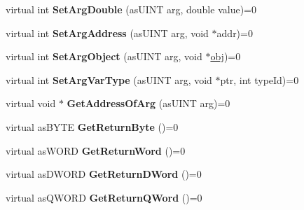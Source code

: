 \begin{DoxyCompactItemize}
\item 
\mbox{\label{classas_i_script_context_acbdddda3b80c37b70b8fd35c8e7383b9}} 
virtual int {\bfseries Set\+Arg\+Double} (as\+U\+I\+NT arg, double value)=0
\item 
\mbox{\label{classas_i_script_context_aa8de8f21dfbb2cdf0becbabaa3e883ed}} 
virtual int {\bfseries Set\+Arg\+Address} (as\+U\+I\+NT arg, void $\ast$addr)=0
\item 
\mbox{\label{classas_i_script_context_a09044a12dfb2d44d19bd8a4025cb814d}} 
virtual int {\bfseries Set\+Arg\+Object} (as\+U\+I\+NT arg, void $\ast$\hyperlink{structobj}{obj})=0
\item 
\mbox{\label{classas_i_script_context_a626d97ec564c92120e2abaf69f6e3698}} 
virtual int {\bfseries Set\+Arg\+Var\+Type} (as\+U\+I\+NT arg, void $\ast$ptr, int type\+Id)=0
\item 
\mbox{\label{classas_i_script_context_a0fbab94982862b30cd55996d4a24949c}} 
virtual void $\ast$ {\bfseries Get\+Address\+Of\+Arg} (as\+U\+I\+NT arg)=0
\item 
\mbox{\label{classas_i_script_context_a4c92259c03f1394310d3ea7d0774b3cb}} 
virtual as\+B\+Y\+TE {\bfseries Get\+Return\+Byte} ()=0
\item 
\mbox{\label{classas_i_script_context_a5a3e054d35a6a361af67448d0a4930f9}} 
virtual as\+W\+O\+RD {\bfseries Get\+Return\+Word} ()=0
\item 
\mbox{\label{classas_i_script_context_a43cd2fb72685aef96e8ddc622c9621bf}} 
virtual as\+D\+W\+O\+RD {\bfseries Get\+Return\+D\+Word} ()=0
\item 
\mbox{\label{classas_i_script_context_a22bdd3b67dee3b1dbcb3f9f9a1f21fa4}} 
virtual as\+Q\+W\+O\+RD {\bfseries Get\+Return\+Q\+Word} ()=0
\item 
\mbox{\label{classas_i_script_context_a4ad325995e43fe6a929bcbd8fa592500}} 

\end{DoxyCompactItemize}
